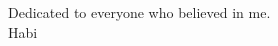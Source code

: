 \thispagestyle{empty}
{}

\vspace*{3cm}

\begin{center}
    Dedicated to everyone who believed in me. \\ \smallskip
    Habi
\end{center}